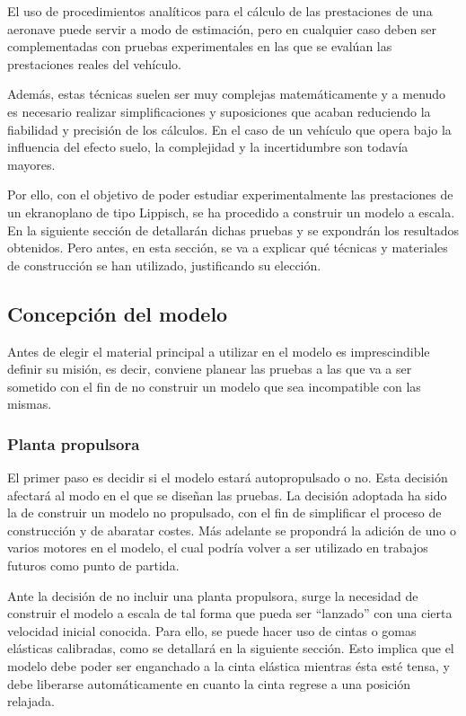 El uso de procedimientos analíticos para el cálculo de las prestaciones de una aeronave puede servir a modo de estimación, pero en cualquier caso deben ser complementadas con pruebas experimentales en las que se evalúan las prestaciones reales del vehículo.

Además, estas técnicas suelen ser muy complejas matemáticamente y a menudo es necesario realizar simplificaciones y suposiciones que acaban reduciendo la fiabilidad y precisión de los cálculos. En el caso de un vehículo que opera bajo la influencia del efecto suelo, la complejidad y la incertidumbre son todavía mayores.

Por ello, con el objetivo de poder estudiar experimentalmente las prestaciones de un ekranoplano de tipo Lippisch, se ha procedido a construir un modelo a escala. En la siguiente sección de detallarán dichas pruebas y se expondrán los resultados obtenidos. Pero antes, en esta sección, se va a explicar qué técnicas y materiales de construcción se han utilizado, justificando su elección.


\subsection{Concepción del modelo}
\label{sec:building:conception}

Antes de elegir el material principal a utilizar en el modelo es imprescindible definir su misión, es decir, conviene planear las pruebas a las que va a ser sometido con el fin de no construir un modelo que sea incompatible con las mismas.

\subsubsection{Planta propulsora}
\label{sec:building:conception:propulsion}

El primer paso es decidir si el modelo estará autopropulsado o no. Esta decisión afectará al modo en el que se diseñan las pruebas. La decisión adoptada ha sido la de construir un modelo no propulsado, con el fin de simplificar el proceso de construcción y de abaratar costes. Más adelante se propondrá la adición de uno o varios motores en el modelo, el cual podría volver a ser utilizado en trabajos futuros como punto de partida.

Ante la decisión de no incluir una planta propulsora, surge la necesidad de construir el modelo a escala de tal forma que pueda ser “lanzado” con una cierta velocidad inicial conocida. Para ello, se puede hacer uso de cintas o gomas elásticas calibradas, como se detallará en la siguiente sección. Esto implica que el modelo debe poder ser enganchado a la cinta elástica mientras ésta esté tensa, y debe liberarse automáticamente en cuanto la cinta regrese a una posición relajada.

